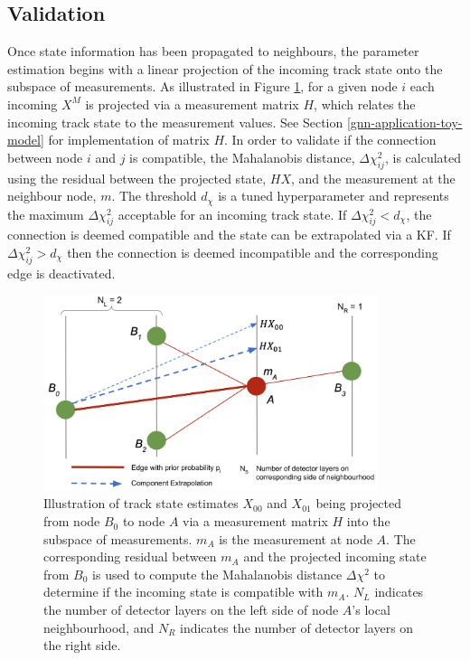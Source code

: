 \subsection{Validation}
Once state information has been propagated to neighbours, the parameter estimation begins with a linear projection of the incoming track state onto the subspace of measurements. As illustrated in Figure \ref{fig:extrapolation}, for a given node $i$ each incoming $X^M$ is projected via a measurement matrix $H$, which relates the incoming track state to the measurement values. See Section \ref{gnn-application-toy-model} for implementation of matrix $H$. In order to validate if the connection between node $i$ and $j$ is compatible, the Mahalanobis distance, $\Delta \chi^{2}_{ij}$, is calculated using the residual between the projected state, $HX$, and the measurement at the neighbour node, $m$. The threshold $d_{\chi}$ is a tuned hyperparameter and represents the maximum $\Delta \chi^{2}_{ij}$ acceptable for an incoming track state. If $\Delta \chi^{2}_{ij} < d_{\chi}$, the connection is deemed compatible and the state can be extrapolated via a KF. If $\Delta \chi^{2}_{ij} > d_{\chi}$ then the connection is deemed incompatible and the corresponding edge is deactivated.

\begin{figure}[htbp]
        \centering
        \includegraphics[width=0.87\textwidth]{images/5-gnn-algorithm/gnn-extrapolation.png}
        \caption{Illustration of track state estimates $X_{00}$ and $X_{01}$ being projected from node $B_0$ to node $A$ via a measurement matrix $H$ into the subspace of measurements. $m_A$ is the measurement at node $A$. The corresponding residual between $m_A$ and the projected incoming state from $B_0$ is used to compute the Mahalanobis distance $\Delta \chi^{2}$ to determine if the incoming state is compatible with $m_A$. $N_L$ indicates the number of detector layers on the left side of node $A$'s local neighbourhood, and $N_R$ indicates the number of detector layers on the right side.}
        \label{fig:extrapolation}%
\end{figure}


